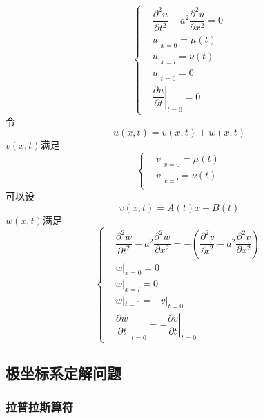 \documentclass{article}
\begin{document}
\begin{equation*}
  \left\{
  \begin{aligned}
    & \dfrac{\partial^{2} u}{\partial t^{2}} - a^{2} \dfrac{\partial^{2} u}{\partial x^{2}} = 0 \\
    & u |_{x=0} = \mu (t)\\
    & u |_{x=l} = \nu (t)\\
    & u |_{t=0} = 0\\
    & \!\!\left. \dfrac{\partial u}{\partial t} \right|_{t=0} = 0
  \end{aligned}
  \right.
\end{equation*}
令
\begin{equation*}
  u(x,t) = v(x,t) + w(x,t)
\end{equation*}
$v(x,t)$满足
\begin{equation*}
  \left\{
  \begin{aligned}
    & v |_{x=0} = \mu (t)\\
    & v |_{x=l} = \nu (t)\\
  \end{aligned}
  \right.
\end{equation*}
可以设
\begin{equation*}
  v(x,t) = A(t) x + B(t)
\end{equation*}
$w(x,t)$满足
\begin{equation*}
  \left\{
  \begin{aligned}
    & \dfrac{\partial^{2} w}{\partial t^{2}} - a^{2} \dfrac{\partial^{2} w}{\partial x^{2}} = - \left( \dfrac{\partial^{2} v}{\partial t^{2}} - a^{2} \dfrac{\partial^{2} v}{\partial x^{2}} \right) \\
    & w |_{x=0} = 0\\
    & w |_{x=l} = 0\\
    & w |_{t=0} = - v |_{t=0}\\
    & \!\!\left. \dfrac{\partial w}{\partial t} \right|_{t=0} = - \left. \dfrac{\partial v}{\partial t} \right|_{t=0}
  \end{aligned}
  \right.
\end{equation*}

\subsection{极坐标系定解问题}

\subsubsection{拉普拉斯算符}
\end{document}
